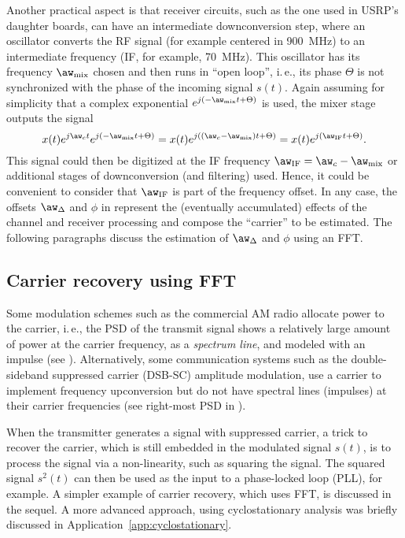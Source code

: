 Another practical aspect is that receiver circuits, such as the one used in USRP's daughter boards, can have an intermediate downconversion step, where an oscillator converts the RF signal (for example centered in 900~MHz) to an intermediate frequency (IF, for example, 70~MHz). This oscillator has its frequency $\aw_{\textrm{mix}}$ chosen and then runs in ``open loop'', i.\,e., its phase $\Theta$ is not synchronized with the phase of the incoming signal $s(t)$. Again assuming for simplicity that a complex exponential $e^{j(-\aw_{\textrm{mix}}t + \Theta)}$ is used, the mixer stage outputs the signal
\[
x(t) e^{j \aw_c t} e^{j(-\aw_{\textrm{mix}}t + \Theta)} = x(t) e^{j ((\aw_c -\aw_{\textrm{mix}}) t + \Theta)} = x(t) e^{j (\aw_{\textrm{IF}} t + \Theta)}.
\]
This signal could then be digitized at the IF frequency $\aw_{\textrm{IF}} = \aw_c - \aw_{\textrm{mix}}$ or additional stages of downconversion (and filtering) used. Hence, it could be
convenient to consider that $\aw_{\textrm{IF}}$ is part of the frequency offset.
In any case, the offsets $\aw_{\Delta}$ and $\phi$ in  represent the (eventually accumulated) effects of the channel and receiver processing and compose the ``carrier'' to be estimated. The following paragraphs discuss the estimation of $\aw_{\Delta}$ and $\phi$  using an FFT.


\subsection{Carrier recovery using FFT}

Some modulation schemes such as the commercial AM radio allocate power to the carrier, i.\,e., the PSD of the transmit signal shows a relatively large amount of power at the carrier frequency, as a \emph{spectrum line}, and modeled with an impulse (see ). Alternatively, some  communication systems such as the double-sideband suppressed carrier (DSB-SC) amplitude modulation, use a carrier to implement frequency upconversion but do not have spectral lines (impulses) at their
carrier frequencies (see right-most PSD in ). 

When the transmitter generates a signal with suppressed carrier, a trick to recover the carrier, which is still embedded in the modulated signal $s(t)$, is to process the signal via a non-linearity, such as squaring the signal. The squared signal $s^2(t)$ can then be used as the input to a phase-locked loop (PLL), for example. A simpler example of carrier recovery, which uses FFT, is discussed in the sequel. A more advanced approach, using cyclostationary analysis was briefly discussed in Application~\ref{app:cyclostationary}.

